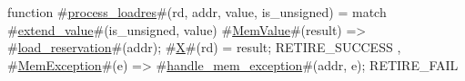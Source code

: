 function #\hyperref[sailRISCVzprocesszyloadres]{process\_loadres}#(rd, addr, value, is_unsigned) =
  match #\hyperref[sailRISCVzextendzyvalue]{extend\_value}#(is_unsigned, value) {
    #\hyperref[sailRISCVzMemValue]{MemValue}#(result) => { #\hyperref[sailRISCVzloadzyreservation]{load\_reservation}#(addr); #\hyperref[sailRISCVzX]{X}#(rd) = result; RETIRE_SUCCESS },
    #\hyperref[sailRISCVzMemException]{MemException}#(e)  => { #\hyperref[sailRISCVzhandlezymemzyexception]{handle\_mem\_exception}#(addr, e); RETIRE_FAIL }
  }
